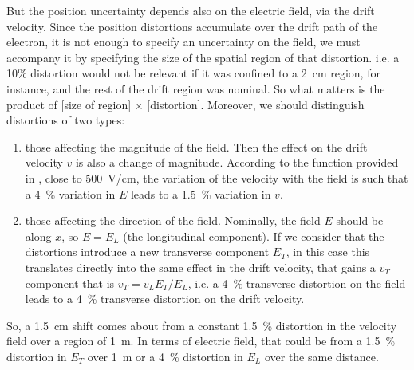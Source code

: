 But the position uncertainty depends also on the electric field, via the drift velocity. Since the position distortions accumulate over the drift path of the electron, it is not enough to specify an uncertainty on the field, we must accompany it by specifying the size of the spatial region of that distortion. i.e. a \num{10}\% distortion would not be relevant if it was confined to a \num{2}~cm region, for instance, and the rest of the drift region was nominal. So what matters is the product of [size of region] $\times$ [distortion]. Moreover, we should distinguish distortions of two types:
\begin{enumerate}
\item those affecting the magnitude of the field. Then the effect on the drift velocity $v$ is also a change of magnitude. According to the function provided in \cite{walkoviak2000}, close to \num{500}~V/cm, the variation of the velocity with the field is such that a \num{4}~\% variation in $E$ leads to a \num{1.5}~\% variation in $v$.
\item those affecting the direction of the field. Nominally, the field $E$ should be along $x$, so $E = E_L$ (the longitudinal component). If we consider that the distortions introduce a new transverse component $E_T$, in this case this translates directly into the same effect in the drift velocity, that gains a $v_T$ component that is $v_T=v_L  E_T/E_L $, i.e. a \num{4}~\% transverse distortion on the field leads to a \num{4}~\% transverse distortion on the drift velocity.
\end{enumerate}

So, a \num{1.5}~cm shift comes about from a constant \num{1.5}~\% distortion in the velocity field over a region of \num{1}~m. In terms of electric field, that could be from a \num{1.5}~\% distortion in $E_T$ over 1~m or a \num{4}~\% distortion in $E_L$ over the same distance.

